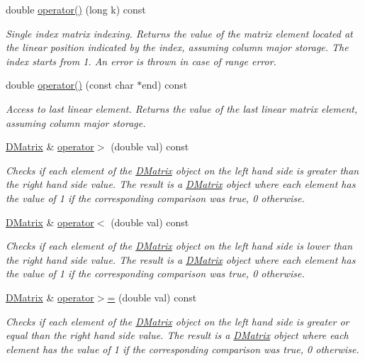 \begin{DoxyCompactItemize}
double \hyperlink{classDMatrix_a181f357abea59bca3f4d9efb16fb5618}{operator()} (long k) const 
\begin{DoxyCompactList}\small\item\em Single index matrix indexing. Returns the value of the matrix element located at the linear position indicated by the index, assuming column major storage. The index starts from 1. An error is thrown in case of range error. \item\end{DoxyCompactList}\item 
double \hyperlink{classDMatrix_a107a1b256e91c653cd48a863ba063494}{operator()} (const char $\ast$end) const 
\begin{DoxyCompactList}\small\item\em Access to last linear element. Returns the value of the last linear matrix element, assuming column major storage. \item\end{DoxyCompactList}\item 
\hyperlink{classDMatrix}{DMatrix} \& \hyperlink{classDMatrix_ac13b6fc14bdd5f3947cccb8f41173433}{operator$>$} (double val) const 
\begin{DoxyCompactList}\small\item\em Checks if each element of the \hyperlink{classDMatrix}{DMatrix} object on the left hand side is greater than the right hand side value. The result is a \hyperlink{classDMatrix}{DMatrix} object where each element has the value of 1 if the corresponding comparison was true, 0 otherwise. \item\end{DoxyCompactList}\item 
\hyperlink{classDMatrix}{DMatrix} \& \hyperlink{classDMatrix_a60f1f1c8766a649c91c64243a7f37b77}{operator$<$} (double val) const 
\begin{DoxyCompactList}\small\item\em Checks if each element of the \hyperlink{classDMatrix}{DMatrix} object on the left hand side is lower than the right hand side value. The result is a \hyperlink{classDMatrix}{DMatrix} object where each element has the value of 1 if the corresponding comparison was true, 0 otherwise. \item\end{DoxyCompactList}\item 
\hyperlink{classDMatrix}{DMatrix} \& \hyperlink{classDMatrix_adf2cf4223a098eb273fd3b6c71fea201}{operator$>$=} (double val) const 
\begin{DoxyCompactList}\small\item\em Checks if each element of the \hyperlink{classDMatrix}{DMatrix} object on the left hand side is greater or equal than the right hand side value. The result is a \hyperlink{classDMatrix}{DMatrix} object where each element has the value of 1 if the corresponding comparison was true, 0 otherwise. \item\end{DoxyCompactList}\item 

\end{DoxyCompactItemize}
